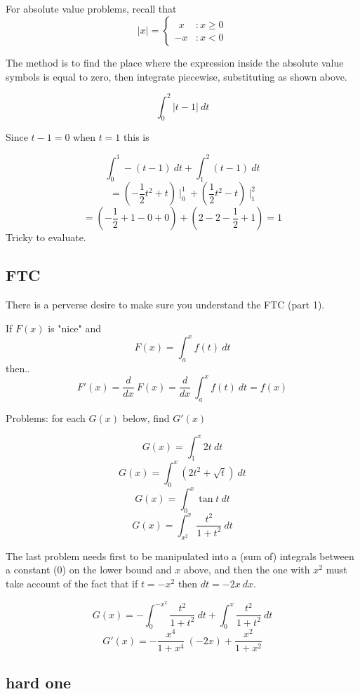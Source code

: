 \documentclass[11pt, oneside]{article}
\begin{document}
\subsection*{}

For absolute value problems, recall that
 \begin{displaymath}
   |x| = \left\{
     \begin{array}{lr}
       \ \ x & : x \ge 0 \\
       -x & : x < 0
     \end{array}
   \right.
\end{displaymath} 

The method is to find the place where the expression inside the absolute value symbols is equal to zero, then integrate piecewise, substituting as shown above.

\[ \int_0^2 |t-1| \ dt \]

Since $t-1 = 0$ when $t=1$ this is

\[ \int_0^1 -(t-1) \ dt + \int_1^2 (t-1) \ dt \]
\[ = (-\frac{1}{2} t^2 + t) \  \bigg |_0^1 \ + (\frac{1}{2} t^2 - t) \ \bigg |_1^2 \]
\[ = (-\frac{1}{2}  + 1  - 0 + 0) + (2 - 2 - \frac{1}{2} + 1) = 1 \]
Tricky to evaluate.

\subsection*{FTC}

There is a perverse desire to make sure you understand the FTC (part 1).

If $F(x)$ is "nice" and
\[ F(x) = \int_a^x f(t) \ dt \]
then..
\[ F'(x) = \frac{d}{dx} \ F(x) = \frac{d}{dx} \  \int_a^x f(t) \ dt = f(x) \]

Problems:  for each $G(x)$ below, find $G'(x)$

\[ G(x) = \int_1^x 2t \ dt \]
\[ G(x) = \int_0^x (2t^2 + \sqrt{t}) \ dt \]
\[ G(x) = \int_0^x \tan t \ dt \]
\[ G(x) = \int_{x^2}^x \frac{t^2}{1+t^2} \ dt \]

The last problem needs first to be manipulated into a (sum of) integrals between a constant ($0$) on the lower bound and $x$ above, and then the one with $x^2$ must take account of the fact that if $t=-x^2$ then $dt = -2x \ dx$.

\[ G(x) = - \int_0^{-x^2} \frac{t^2}{1+t^2} \ dt +   \int_0^x \frac{t^2}{1+t^2} \ dt \]
\[ G'(x) = - \frac{x^4}{1 + x^4} \ (-2x) + \frac{x^2}{1+x^2} \]

\subsection*{hard one}
\end{document}
